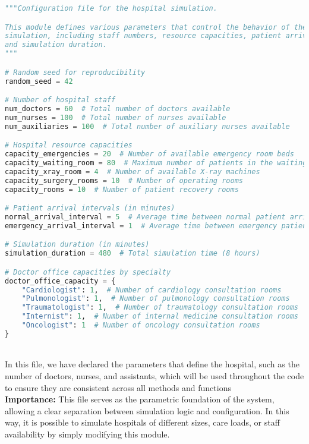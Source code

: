 \documentclass[a4paper,12pt]{article}
\begin{document}
\begin{lstlisting}[language=Python]
"""Configuration file for the hospital simulation.

This module defines various parameters that control the behavior of the hospital 
simulation, including staff numbers, resource capacities, patient arrival intervals, 
and simulation duration.
"""

# Random seed for reproducibility
random_seed = 42  

# Number of hospital staff
num_doctors = 60  # Total number of doctors available
num_nurses = 100  # Total number of nurses available
num_auxiliaries = 100  # Total number of auxiliary nurses available

# Hospital resource capacities
capacity_emergencies = 20  # Number of available emergency room beds
capacity_waiting_room = 80  # Maximum number of patients in the waiting room
capacity_xray_room = 4  # Number of available X-ray machines
capacity_surgery_rooms = 10  # Number of operating rooms
capacity_rooms = 10  # Number of patient recovery rooms

# Patient arrival intervals (in minutes)
normal_arrival_interval = 5  # Average time between normal patient arrivals
emergency_arrival_interval = 1  # Average time between emergency patient arrivals

# Simulation duration (in minutes)
simulation_duration = 480  # Total simulation time (8 hours)

# Doctor office capacities by specialty
doctor_office_capacity = {
    "Cardiologist": 1,  # Number of cardiology consultation rooms
    "Pulmonologist": 1,  # Number of pulmonology consultation rooms
    "Traumatologist": 1,  # Number of traumatology consultation rooms
    "Internist": 1,  # Number of internal medicine consultation rooms
    "Oncologist": 1  # Number of oncology consultation rooms
}

\end{lstlisting}
\\
In this file, we have declared the parameters that define the hospital, such as the number of doctors, nurses, and assistants, which will be used throughout the code to ensure they are consistent across all methods and functions
\\
\textbf{Importance:}
This file serves as the parametric foundation of the system, allowing a clear separation between simulation logic and configuration. In this way, it is possible to simulate hospitals of different sizes, care loads, or staff availability by simply modifying this module.
\end{document}
